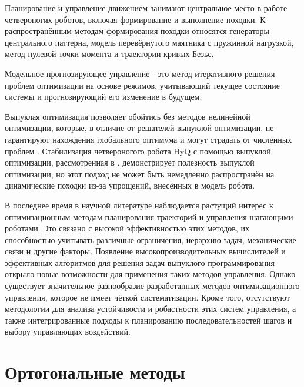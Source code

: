 Планирование и управление движением занимают центральное место в работе четвероногих роботов, включая формирование и выполнение походки.  К распространённым методам формирования походки относятся генераторы центрального паттерна, модель перевёрнутого маятника с пружинной нагрузкой, метод нулевой точки момента и траектории кривых Безье.

Модельное прогнозирующее управление - это метод итеративного решения проблем оптимизации на основе режимов, учитывающий текущее состояние системы и прогнозирующий его изменение в будущем.

Выпуклая оптимизация позволяет обойтись без методов нелинейной оптимизации, которые, в отличие от решателей выпуклой оптимизации, не гарантируют нахождения глобального оптимума и могут страдать от численных проблем \cite{boyd2004convex}. Стабилизация четвероногого робота HyQ с помощью выпуклой оптимизации, рассмотренная в \cite{Focchi2016}, демонстрирует полезность выпуклой оптимизации, но этот подход не может быть немедленно распространён на динамические походки из-за  упрощений, внесённых в модель робота.

В последнее время в научной литературе наблюдается растущий интерес к оптимизационным методам планирования траекторий и управления шагающими роботами. Это связано с высокой эффективностью этих методов, их способностью учитывать различные ограничения, иерархию задач, механические связи и другие факторы. Появление высокопроизводительных вычислителей и эффективных алгоритмов для решения задач выпуклого программирования открыло новые возможности для применения таких методов управления. Однако существует значительное разнообразие разработанных методов оптимизационного управления, которое не имеет чёткой систематизации. Кроме того, отсутствуют методологии для анализа устойчивости и робастности этих систем управления, а также интегрированные подходы к планированию последовательностей шагов и выбору управляющих воздействий.

\section{Ортогональные методы}\label{sec:ch1/sec3}

